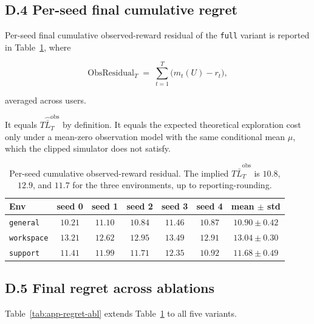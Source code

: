 \documentclass{article} %
\begin{document}
\subsection{D.4 Per-seed final cumulative regret}

\label{app:tab-regret}

Per-seed final cumulative observed-reward residual of the \texttt{full}
variant is reported in Table~\ref{tab:app-regret}, where

\begin{equation}
\label{eq:app-tab-regret}
\mathrm{ObsResidual}_T
\;=\;
\sum_{t=1}^T \big(m_t(U)-r_t\big),
\end{equation}

averaged across users.

It equals \(T\widehat{\bar L}_T^{\mathrm{obs}}\) by definition. It equals the
expected theoretical exploration cost only under a mean-zero observation model
with the same conditional mean \(\mu\), which the clipped simulator does not
satisfy.

\begin{table}[h]
\centering
\small
\begin{tabular}{lccccc|c}
\toprule
Env & seed 0 & seed 1 & seed 2 & seed 3 & seed 4 & mean $\pm$ std \\
\midrule
\texttt{general}                 & $10.21$ & $11.10$ & $10.84$ & $11.46$ & $10.87$ & $10.90 \pm 0.42$ \\
\texttt{workspace}               & $13.21$ & $12.62$ & $12.95$ & $13.49$ & $12.91$ & $13.04 \pm 0.30$ \\
\texttt{support}                 & $11.41$ & $11.99$ & $11.71$ & $12.35$ & $10.92$ & $11.68 \pm 0.49$ \\
\bottomrule
\end{tabular}
\caption{Per-seed cumulative observed-reward residual. The implied
\(T\widehat{\bar L}_T^{\mathrm{obs}}\) is \(10.8\), \(12.9\), and \(11.7\)
for the three environments, up to reporting-rounding.}
\label{tab:app-regret}
\end{table}

\subsection{D.5 Final regret across ablations}

\label{app:tab-regret-ablation}

Table~\ref{tab:app-regret-abl} extends Table~\ref{tab:app-regret} to all five variants.
\end{document}
